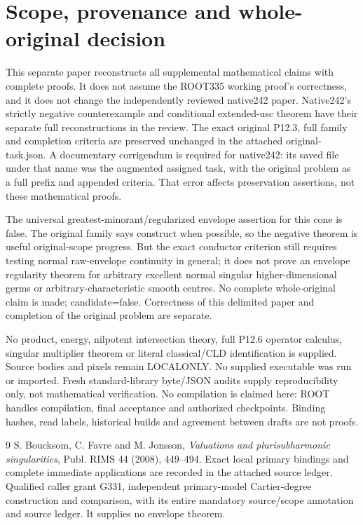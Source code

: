 \documentclass[11pt]{article}
\begin{document}
\section{Scope, provenance and whole-original decision}
This separate paper reconstructs all supplemental mathematical claims with
complete proofs. It does not assume the ROOT335 working proof's correctness,
and it does not change the independently reviewed native242 paper. Native242's
strictly negative counterexample and conditional extended-usc theorem have
their separate full reconstructions in the review.
The exact original P12.3, full family and completion criteria are preserved
unchanged in the attached original-task.json. A documentary corrigendum is
required for native242: its saved file under that name was the augmented
assigned task, with the original problem as a full prefix and appended criteria.
That error affects preservation assertions, not these mathematical proofs.

The universal greatest-minorant/regularized envelope assertion for this cone
is false. The original family says construct when possible, so the negative
theorem is useful original-scope progress. But the exact conductor criterion
still requires testing normal raw-envelope continuity in general; it does not
prove an envelope regularity theorem for arbitrary excellent normal singular
higher-dimensional germs or arbitrary-characteristic smooth centres. No complete
whole-original claim is made; candidate=false. Correctness of this delimited
paper and completion of the original problem are separate.

No product, energy, nilpotent intersection theory, full P12.6 operator calculus,
singular multiplier theorem or literal classical/CLD identification is supplied.
Source bodies and pixels remain LOCALONLY. No supplied executable was run or
imported. Fresh standard-library byte/JSON audits supply reproducibility only,
not mathematical verification. No compilation is claimed here: ROOT handles
compilation, final acceptance and authorized checkpoints. Binding hashes,
read labels, historical builds and agreement between drafts are not proofs.

\begin{thebibliography}{9}
 S. Boucksom, C. Favre and M. Jonsson,
\emph{Valuations and plurisubharmonic singularities},
Publ. RIMS 44 (2008), 449--494. Exact local primary bindings and complete
immediate applications are recorded in the attached source ledger.
 Qualified caller grant G331, independent primary-model
Cartier-degree construction and comparison, with its entire mandatory
source/scope annotation and source ledger. It supplies no envelope theorem.
\end{thebibliography}
\end{document}
